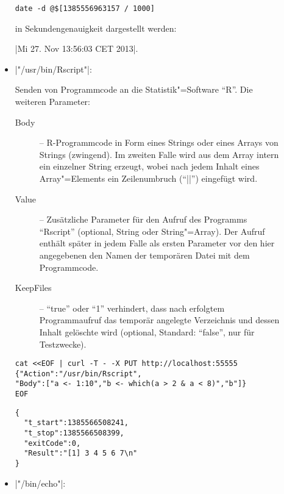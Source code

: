 \documentclass[%
fontsize=11pt
,paper=a4
,twoside
,headings=normal
,pagesize
]{scrartcl}
\begin{document}
\begin{description}
\begin{itemize}
\begin{lstlisting}[language={}]
date -d @$[1385556963157 / 1000]
\end{lstlisting}

      in Sekundengenauigkeit dargestellt werden: \par
      \quad |Mi 27. Nov 13:56:03 CET 2013|.

    \item |"/usr/bin/Rscript"|: \par

      Senden von Programmcode an die Statistik"=Software "`R"'. Die weiteren
      Parameter:
      \begin{description}

        \item[Body] -- R-Programmcode in Form eines Strings oder eines
        Arrays von Strings (zwingend). Im zweiten Falle wird aus dem Array
        intern ein einzelner String erzeugt, wobei nach jedem Inhalt eines
        Array"=Elements ein Zeilenumbruch ("`|\n|"') eingefügt wird.

        \item[Value] -- Zusätzliche Parameter für den Aufruf des Programms
        "`Rscript"' (optional, String oder String"=Array). Der Aufruf
        enthält später in jedem Falle als ersten Parameter vor den hier
        angegebenen den Namen der temporären Datei mit dem Programmcode.

        \item[KeepFiles] -- "`true"' oder "`1"' verhindert, dass nach
        erfolgtem Programmaufruf das temporär angelegte Verzeichnis und
        dessen Inhalt gelöschte wird (optional, Standard: "`false"', nur für
        Testzwecke).

      \end{description}
\enlargethispage{-2\baselineskip}
\begin{lstlisting}[language={},name=Beispiel:]
cat <<EOF | curl -T - -X PUT http://localhost:55555
{"Action":"/usr/bin/Rscript",
"Body":["a <- 1:10","b <- which(a > 2 & a < 8)","b"]}
EOF
\end{lstlisting}

\begin{lstlisting}[language={},name=Rückgabe:]
{
  "t_start":1385566508241,
  "t_stop":1385566508399,
  "exitCode":0,
  "Result":"[1] 3 4 5 6 7\n"
}
\end{lstlisting}

    \item |"/bin/echo"|: \par


\end{itemize}
\end{description}
\end{document}
